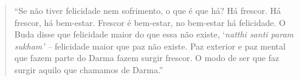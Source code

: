 

\cleartoverso

\begin{quote}
“Se não tiver felicidade nem sofrimento, o que é que há? Há frescor. Há
frescor, há bem-estar. Frescor é bem-estar, no bem-estar há felicidade.
O Buda disse que felicidade maior do que essa não existe,
‘\textit{natthi santi param sukham’} \textit{–} felicidade maior que
paz não existe. Paz exterior e paz mental que fazem parte do Darma
fazem surgir frescor. O modo de ser que faz surgir aquilo que chamamos
de Darma.”
\end{quote}


